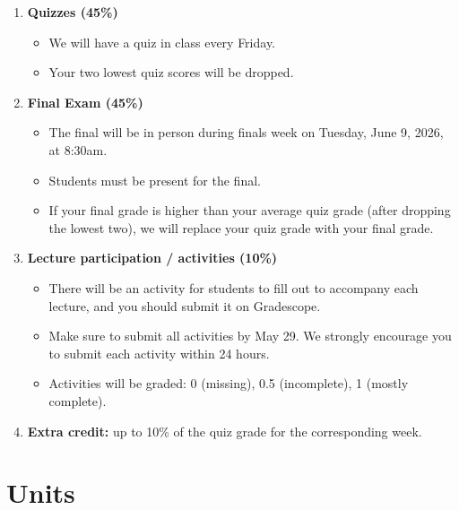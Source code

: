 \documentclass[
  letterpaper,
  DIV=11,
  numbers=noendperiod]{scrreprt}
\providecommand{\tightlist}{%
  \setlength{\itemsep}{0pt}\setlength{\parskip}{0pt}}
\begin{document}
\begin{enumerate}
\def\labelenumi{\arabic{enumi}.}
\tightlist
\item
  \textbf{Quizzes (45\%)}

  \begin{itemize}
  \tightlist
  \item
    We will have a quiz in class every Friday.
  \item
    Your two lowest quiz scores will be dropped.
  \end{itemize}
\item
  \textbf{Final Exam (45\%)}

  \begin{itemize}
  \tightlist
  \item
    The final will be in person during finals week on Tuesday, June 9,
    2026, at 8:30am.
  \item
    Students must be present for the final.
  \item
    If your final grade is higher than your average quiz grade (after
    dropping the lowest two), we will replace your quiz grade with your
    final grade.
  \end{itemize}
\item
  \textbf{Lecture participation / activities (10\%)}

  \begin{itemize}
  \tightlist
  \item
    There will be an activity for students to fill out to accompany each
    lecture, and you should submit it on Gradescope.
  \item
    Make sure to submit all activities by May 29. We strongly encourage
    you to submit each activity within 24 hours.
  \item
    Activities will be graded: 0 (missing), 0.5 (incomplete), 1 (mostly
    complete).
  \end{itemize}
\item
  \textbf{Extra credit:} up to 10\% of the quiz grade for the
  corresponding week.
\end{enumerate}

\section*{Units}\label{units}

\end{document}

